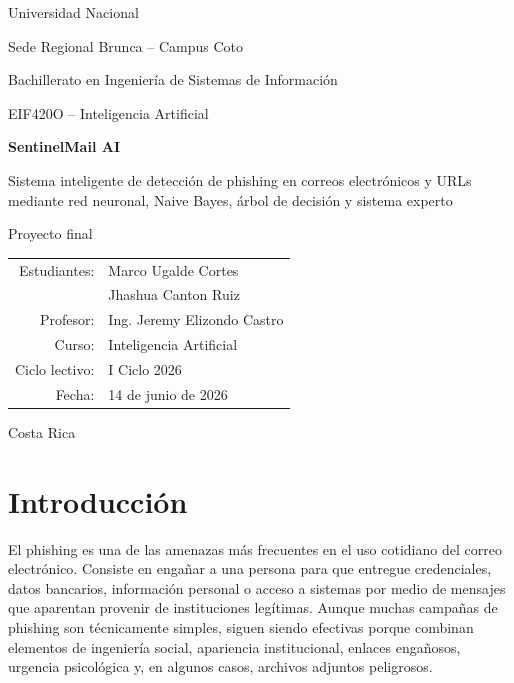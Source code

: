 \documentclass[12pt,letterpaper]{article}
\begin{document}
\begin{titlepage}
    \centering
    \vspace*{1cm}
    {\Large Universidad Nacional\par}
    {\large Sede Regional Brunca -- Campus Coto\par}
    {\large Bachillerato en Ingeniería de Sistemas de Información\par}
    \vspace{1.5cm}
    {\large EIF420O -- Inteligencia Artificial\par}
    \vspace{2cm}
    {\Huge\bfseries SentinelMail AI\par}
    \vspace{0.4cm}
    {\Large Sistema inteligente de detección de phishing en correos electrónicos y URLs mediante red neuronal, Naive Bayes, árbol de decisión y sistema experto\par}
    \vspace{2cm}
    {\large Proyecto final\par}
    \vspace{1cm}
    \begin{tabular}{rl}
        Estudiantes: & Marco Ugalde Cortes \\
                     & Jhashua Canton Ruiz \\
        Profesor: & Ing. Jeremy Elizondo Castro \\
        Curso: & Inteligencia Artificial \\
        Ciclo lectivo: & I Ciclo 2026 \\
        Fecha: & 14 de junio de 2026 \\
    \end{tabular}
    \vfill
    {\large Costa Rica\par}
\end{titlepage}

\tableofcontents
\newpage

\section{Introducción}

El phishing es una de las amenazas más frecuentes en el uso cotidiano del correo electrónico. Consiste en engañar a una persona para que entregue credenciales, datos bancarios, información personal o acceso a sistemas por medio de mensajes que aparentan provenir de instituciones legítimas. Aunque muchas campañas de phishing son técnicamente simples, siguen siendo efectivas porque combinan elementos de ingeniería social, apariencia institucional, enlaces engañosos, urgencia psicológica y, en algunos casos, archivos adjuntos peligrosos.
\end{document}
